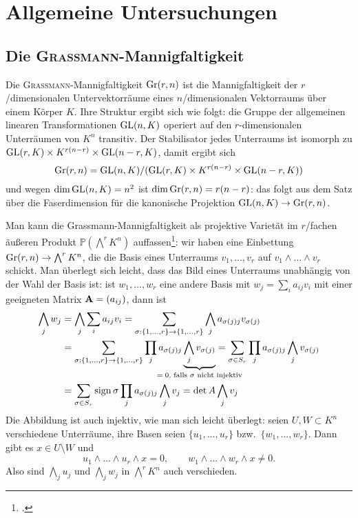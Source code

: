 \chapter{Allgemeine Untersuchungen} \label{chap:general}
\section{Die \textsc{Grassmann}-Mannigfaltigkeit} \label{sec:grassmann}
Die \textsc{Grassmann}-Mannigfaltigkeit $\grass r/n$ ist die Mannigfaltigkeit der $r$\-/dimensionalen Untervektorräume eines $n$\-/dimensionalen Vektorraums über einem Körper $K$. Ihre Struktur ergibt sich wie folgt: die Gruppe der allgemeinen linearen Transformationen $\mathrm{GL}(n,K)$ operiert auf den $r$-dimensionalen Unterräumen von $K^n$ transitiv. Der Stabilisator jedes Unterraums ist isomorph zu $\mathrm{GL}(r,K) \times K^{r(n-r)} \times \mathrm{GL}(n-r,K)$, damit ergibt sich
\begin{equation}
\grass r/n = \GL nK / (\GL rK \times K^{r(n-r)} \times \GL{n-r}K)
\end{equation}
und wegen $\dim \mathrm{GL}(n,K) = n^2$ ist $\dim \grass r/n = r(n-r)$: das folgt aus dem Satz über die Faserdimension für die kanonische Projektion $\GL nK \to \grass r/n$.

Man kann die Grassmann-Mannigfaltigkeit als projektive Varietät im $r$\-/fachen äußeren Produkt $\mathbb P(\bigwedge^r K^n)$ auffassen\footcite[siehe][S.~42]{Shafarevich}: wir haben eine Einbettung $\grass r/n \to \bigwedge^r K^n$, die die Basis eines Unterraums $v_1, \dots, v_r$ auf $v_1 \wedge \dots \wedge v_r$ schickt. Man überlegt sich leicht, dass das Bild eines Unterraums unabhängig von der Wahl der Basis ist: ist $w_1, \dots, w_r$ eine andere Basis mit $w_j = \sum_i a_{ij} v_i$ mit einer geeigneten Matrix $\mathbf{A} = (a_{ij})$, dann ist
\begin{align*}
\bigwedge_j w_j &= \bigwedge_j \sum_i a_{ij} v_i = \sum_{\sigma: \{1,\dots,r\} \rightarrow \{1,\dots,r\}} \bigwedge_j a_{\sigma(j)j} v_{\sigma(j)} \\
	&= \sum_{\sigma: \{1,\dots,r\} \rightarrow \{1,\dots,r\}} \prod_j a_{\sigma(j)j} \wunderbrace{\bigwedge_j v_{\sigma(j)}}_{$= 0$, falls $\sigma$ nicht injektiv} = \sum_{\sigma \in S_r} \prod_j a_{\sigma(j)j} \bigwedge_j v_{\sigma(j)} \\
	&= \sum_{\sigma \in S_r} \sign \sigma \prod_j a_{\sigma(j)j} \bigwedge_j v_j = \det A \bigwedge_j v_j
\end{align*}
Die Abbildung ist auch injektiv, wie man sich leicht überlegt: seien $U, W \subset K^n$ verschiedene Unterräume, ihre Basen seien $\{u_1,\dots,u_r\}$ bzw.~$\{w_1,\dots,w_r\}$. Dann gibt es $x \in U \setminus W$ und
\begin{equation*}
u_1 \wedge \dots \wedge u_r \wedge x = 0, \qquad w_1 \wedge \dots \wedge w_r \wedge x \neq 0.
\end{equation*}
Also sind $\bigwedge_j u_j$ und $\bigwedge_j w_j$ in $\bigwedge^r K^n$ auch verschieden.

